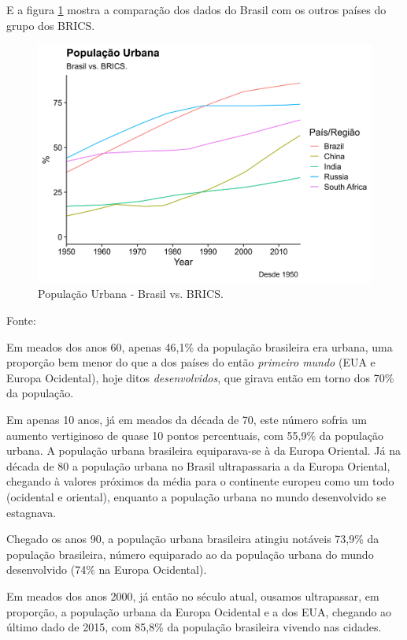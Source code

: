 \documentclass[
	12pt,				%
	oneside,			%
	a4paper,			%
	chapter=TITLE,		%
	section=TITLE,		%
	english,			%
	brazil				%
	]{abntex2}
\newcommand{\bcenter}{\begin{center}}
\newcommand{\ecenter}{\end{center}}
\begin{document}
E a figura \ref{fig:pop-urb-brazil-brics} mostra a comparação dos dados
do Brasil com os outros países do grupo dos BRICS.
\begin{figure}[H]

{\centering \includegraphics[width=0.8\linewidth]{images/pop-urb-brazil-brics-1} 

}

\caption{População Urbana - Brasil vs. BRICS.}\label{fig:pop-urb-brazil-brics}
\end{figure}
\bcenter
Fonte: \textcite{doi:10.1177/0959683609356587} \ecenter

Em meados dos anos 60, apenas 46,1\% da população brasileira era urbana,
uma proporção bem menor do que a dos países do então \emph{primeiro
mundo} (EUA e Europa Ocidental), hoje ditos \emph{desenvolvidos}, que
girava então em torno dos 70\% da população.

Em apenas 10 anos, já em meados da década de 70, este número sofria um
aumento vertiginoso de quase 10 pontos percentuais, com 55,9\% da
população urbana. A população urbana brasileira equiparava-se à da
Europa Oriental. Já na década de 80 a população urbana no Brasil
ultrapassaria a da Europa Oriental, chegando à valores próximos da média
para o continente europeu como um todo (ocidental e oriental), enquanto
a população urbana no mundo desenvolvido se estagnava.

Chegado os anos 90, a população urbana brasileira atingiu notáveis
73,9\% da população brasileira, número equiparado ao da população urbana
do mundo desenvolvido (74\% na Europa Ocidental).

Em meados dos anos 2000, já então no século atual, ousamos ultrapassar,
em proporção, a população urbana da Europa Ocidental e a dos EUA,
chegando ao último dado de 2015, com 85,8\% da população brasileira
vivendo nas cidades.
\end{document}

